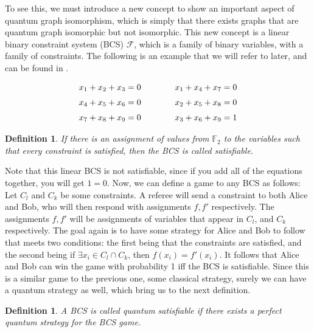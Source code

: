 \documentclass[12pt]{article}
\newtheorem{defn}[thm]{Definition}
\begin{document}
To see this, we must introduce a new concept to show an important
aspect of quantum graph isomorphism, which is simply that there exists
graphs that are quantum graph isomorphic but not isomorphic. This new
concept is a linear binary constraint system (BCS) $\mathcal{F}$,
which is a family of binary variables, with a family of
constraints. The following is an example that we will refer to later,
and can be found in \cite{Binary}.

\begin{equation*}
\label{bcs}
\openup\jot %
\begin{aligned}[t]
x_1 + x_2 + x_3 &= 0 \\
x_4 + x_5 + x_6 &= 0 \\
x_7 + x_8 + x_9 &= 0
\end{aligned}
\qquad\qquad %
\begin{aligned}[t]
x_1 + x_4 + x_7 &= 0 \\
x_2 + x_5 + x_8 &= 0 \\
x_3 + x_6 + x_9 &= 1
\end{aligned}
\end{equation*}

\begin{defn}
  If there is an assignment of values from $\mathbb{F}_2$ to the
  variables such that every constraint is satisfied, then the BCS is
  called satisfiable.
\end{defn}

Note that this linear BCS is not satisfiable, since if you add all of
the equations together, you will get $1=0$. Now, we can define a game
to any BCS as follows: Let $C_l$ and $C_k$ be some constraints. A
referee will send a constraint to both Alice and Bob, who will then
respond with assignments $f, f'$ respectively. The assignments $f, f'$
will be assignments of variables that appear in $C_l$, and $C_k$
respectively. The goal again is to have some strategy for Alice and
Bob to follow that meets two conditions: the first being that the
constraints are satisfied, and the second being if $\exists x_i \in
C_l \cap C_k$, then $f(x_i) = f'(x_i)$. It follows that Alice and Bob
can win the game with probability 1 iff the BCS is satisfiable. Since
this is a similar game to the previous one, some classical strategy,
surely we can have a quantum strategy as well, which bring us to the
next definition.

\begin{defn}
A BCS is called quantum satisfiable if there exists a perfect quantum
strategy for the BCS game.
\end{defn}
\end{document}
